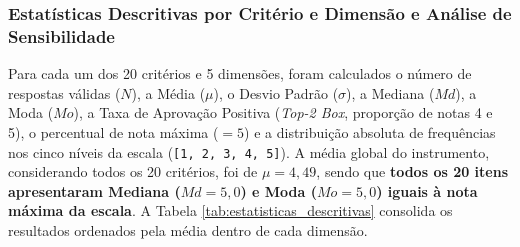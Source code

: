 \subsubsection*{Estatísticas Descritivas por Critério e Dimensão e Análise de Sensibilidade}

Para cada um dos 20 critérios e 5 dimensões, foram calculados o número de respostas válidas ($N$), a Média ($\mu$), o Desvio Padrão ($\sigma$), a Mediana ($Md$), a Moda ($Mo$), a Taxa de Aprovação Positiva (\textit{Top-2 Box}, proporção de notas 4 e 5), o percentual de nota máxima ($= 5$) e a distribuição absoluta de frequências nos cinco níveis da escala (\texttt{[1, 2, 3, 4, 5]}). A média global do instrumento, considerando todos os 20 critérios, foi de \textbf{$\mu = 4,49$}, sendo que \textbf{todos os 20 itens apresentaram Mediana ($Md = 5,0$) e Moda ($Mo = 5,0$) iguais à nota máxima da escala}. A Tabela \ref{tab:estatisticas_descritivas} consolida os resultados ordenados pela média dentro de cada dimensão.

